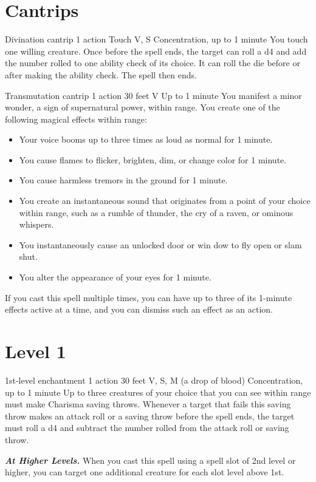 \documentclass[10pt,twoside,twocolumn,openany]{book}
\begin{document}
\section{Cantrips}
{Divination cantrip}
{\color{action} 1 action}
{Touch}
{V, S}
{Concentration, up to 1 minute}
%
You touch one willing creature. Once before the spell ends, the target can roll a d4 and add the number rolled to one ability check of its choice. It can roll the die before or after making the ability check. The spell then ends. 

{Transmutation cantrip}
{\color{action} 1 action}
{30 feet}
{V}
{Up to 1 minute}
%
You manifest a minor wonder, a sign of supernatural power, within range. You create one of the following magical effects within range:
\begin{itemize}
	\item Your voice booms up to three times as loud as normal for 1 minute.
	\item You cause flames to flicker, brighten, dim, or change color for 1 minute.
	\item You cause harmless tremors in the ground for 1 minute.
	\item You create an instantaneous sound that originates from a point of your choice within range, such as a rumble of thunder, the cry of a raven, or ominous whispers.
	\item You instantaneously cause an unlocked door or win  dow to fly open or slam shut.
	\item You alter the appearance of your eyes for 1 minute.
\end{itemize}
If you cast this spell multiple times, you can have up to three of its 1-minute effects active at a time, and you can dismiss such an effect as an action.

\newpage
\section{Level 1}
{1st-level enchantment}
{\color{action} 1 action}
{30 feet}
{V, S, M (a drop of blood)}
{Concentration, up to 1 minute}
%
Up to three creatures of your choice that you can see within range must make Charisma saving throws. Whenever a target that fails this saving throw makes an attack roll or a saving throw before the spell ends, the target must roll a d4 and subtract the number rolled from the attack roll or saving throw.

\textbf{\textit{At Higher Levels.}} When you cast this spell using a spell slot of 2nd level or higher, you can target one additional creature for each slot level above 1st.
\end{document}
